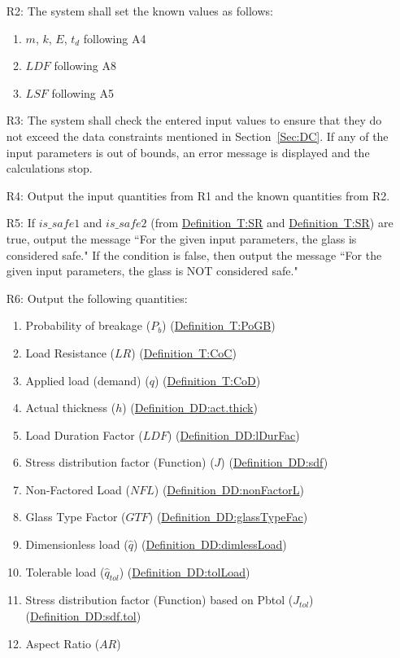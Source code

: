 \documentclass[12pt]{article}
\begin{document}
\begin{itemize}
\item[R2:]The system shall set the known values as follows: 
          \begin{enumerate}
          \item{$m$, $k$, $E$, $t_{d}$ following A4}
          \item{$LDF$ following A8}
          \item{$LSF$ following A5}
          \end{enumerate}
\item[R3:]The system shall check the entered input values to ensure that they do not exceed the data constraints mentioned in Section~\ref{Sec:DC}. If any of the input parameters is out of bounds, an error message is displayed and the calculations stop.
\item[R4:]Output the input quantities from R1 and the known quantities from R2.
\item[R5:]If $is\_safe1$ and $is\_safe2$ (from \hyperref[T:SR]{Definition~T:SR} and \hyperref[T:SR]{Definition~T:SR}) are true, output the message ``For the given input parameters, the glass is considered safe." If the condition is false, then output the message ``For the given input parameters, the glass is NOT considered safe."
\item[R6:]Output the following quantities:
          \begin{enumerate}
          \item{Probability of breakage ($P_{b}$) (\hyperref[T:PoGB]{Definition~T:PoGB})}
          \item{Load Resistance ($LR$) (\hyperref[T:CoC]{Definition~T:CoC})}
          \item{Applied load (demand) ($q$) (\hyperref[T:CoD]{Definition~T:CoD})}
          \item{Actual thickness ($h$) (\hyperref[DD:act.thick]{Definition~DD:act.thick})}
          \item{Load Duration Factor ($LDF$) (\hyperref[DD:lDurFac]{Definition~DD:lDurFac})}
          \item{Stress distribution factor (Function) ($J$) (\hyperref[DD:sdf]{Definition~DD:sdf})}
          \item{Non-Factored Load ($NFL$) (\hyperref[DD:nonFactorL]{Definition~DD:nonFactorL})}
          \item{Glass Type Factor ($GTF$) (\hyperref[DD:glassTypeFac]{Definition~DD:glassTypeFac})}
          \item{Dimensionless load ($\hat{q}$) (\hyperref[DD:dimlessLoad]{Definition~DD:dimlessLoad})}
          \item{Tolerable load ($\hat{q}_{tol}$) (\hyperref[DD:tolLoad]{Definition~DD:tolLoad})}
          \item{Stress distribution factor (Function) based on Pbtol ($J_{tol}$) (\hyperref[DD:sdf.tol]{Definition~DD:sdf.tol})}
          \item{Aspect Ratio ($AR$)}
          \end{enumerate}
\end{itemize}
\end{document}
